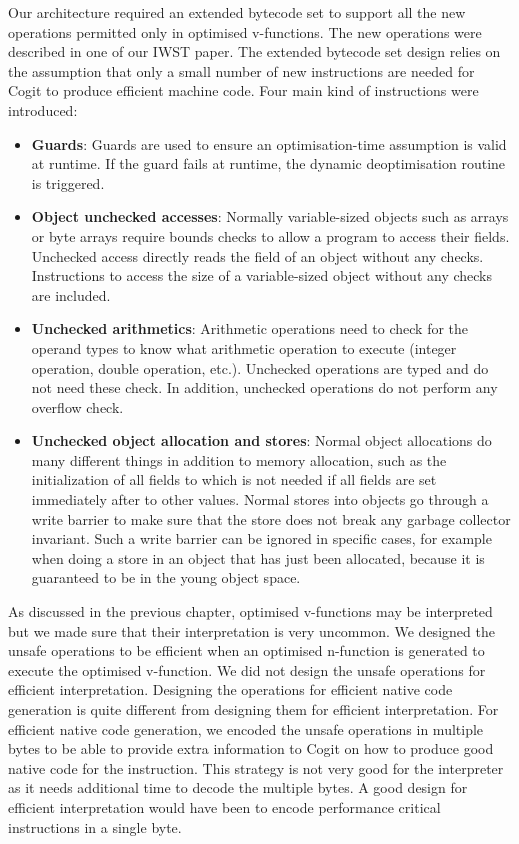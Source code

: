 \documentclass[a4paper,12pt,twoside]{../includes/ThesisStyle}
\begin{document}
Our architecture required an extended bytecode set to support all the new operations permitted only in optimised v-functions. The new operations were described in one of our IWST paper\cite{Bera14a}. The extended bytecode set design relies on the assumption that only a small number of new instructions are needed for Cogit to produce efficient machine code. Four main kind of instructions were introduced:
\begin{itemize}
\item \textbf{Guards}: Guards are used to ensure an optimisation-time assumption is valid at runtime. If the guard fails at runtime, the dynamic deoptimisation routine is triggered.
\item \textbf{Object unchecked accesses}: Normally variable-sized objects such as arrays or byte arrays require bounds checks to allow a program to access their fields. Unchecked access directly reads the field of an object without any checks. Instructions to access the size of a variable-sized object without any checks are included.
\item \textbf{Unchecked arithmetics}: Arithmetic operations need to check for the operand types to know what arithmetic operation to execute (integer operation, double operation, etc.). Unchecked operations are typed and do not need these check. In addition, unchecked operations do not perform any overflow check.
\item \textbf{Unchecked object allocation and stores}: Normal object allocations do many different things in addition to memory allocation, such as the initialization of all fields to  which is not needed if all fields are set immediately after to other values. Normal stores into objects go through a write barrier to make sure that the store does not break any garbage collector invariant. Such a write barrier can be ignored in specific cases, for example when doing a store in an object that has just been allocated, because it is guaranteed to be in the young object space.
\end{itemize}

As discussed in the previous chapter, optimised v-functions may be interpreted but we made sure that their interpretation is very uncommon. We designed the unsafe operations to be efficient when an optimised n-function is generated to execute the optimised v-function. We did not design the unsafe operations for efficient interpretation. Designing the operations for efficient native code generation is quite different from designing them for efficient interpretation. For efficient native code generation, we encoded the unsafe operations in multiple bytes to be able to provide extra information to Cogit on how to produce good native code for the instruction. This strategy is not very good for the interpreter as it needs additional time to decode the multiple bytes. A good design for efficient interpretation would have been to encode performance critical instructions in a single byte.
\end{document}
